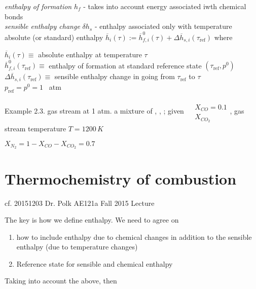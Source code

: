 \documentclass[10pt]{amsart}
\begin{document}
\begin{multicols*}{2}
\emph{enthalpy of formation} $h_f$ - takes into account energy associated iwth chemical bonds \\
\emph{sensible enthalpy change} $\delta h_s$ - enthalpy associated only with temperature     \\
absolute (or standard) enthalpy $\overline{h}_i(\tau) := \overline{h}^0_{f,i}(\tau) + \Delta \overline{h}_{s,i}(\tau_{\text{ref}})$  where

$\overline{h}_i(\tau) \equiv $ absolute enthalpy at temperature $\tau$ \\
$\overline{h}_{f,i}^0(\tau_{\text{ref}}) \equiv $ enthalpy of formation at standard reference state $(\tau_{\text{ref}},p^0)$ \\
$\Delta \overline{h}_{s,i}(\tau_{\text{ref}}) \equiv $ sensible enthalpy change in going from $\tau_{\text{ref}}$ to $\tau$ \\
$p_{\text{ref}} = p^0 = 1$ \, atm









Example 2.3.\cite{STurns2011} gas stream at 1 atm. a mixture of , , ; given $\begin{aligned} & \quad \\
  & X_{CO} = 0.1 \\
  & X_{CO_2} \end{aligned}$, gas stream temperature $T=1200 \, K$

$X_{N_2} = 1 - X_{CO} - X_{CO_2} = 0.7$








\section{Thermochemistry of combustion}

cf. 20151203 Dr. Polk AE121a Fall 2015 Lecture

The key is how we define enthalpy.  We need to agree on 
\begin{enumerate}
  \item how to include enthalpy due to chemical changes in addition to the sensible enthalpy (due to temperature changes)
  \item Reference state for sensible and chemical enthalpy
\end{enumerate}

Taking into account the above, then


\end{multicols*}
\end{document}

